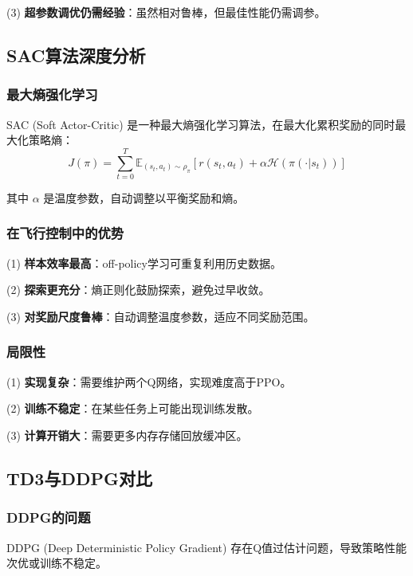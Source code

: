 (3) \textbf{超参数调优仍需经验}：虽然相对鲁棒，但最佳性能仍需调参。

\subsection{SAC算法深度分析}

\subsubsection{最大熵强化学习}

SAC (Soft Actor-Critic) 是一种最大熵强化学习算法，在最大化累积奖励的同时最大化策略熵：
\begin{equation}
J(\pi) = \sum_{t=0}^{T} \mathbb{E}_{(s_t,a_t)\sim\rho_\pi}\left[r(s_t,a_t) + \alpha \mathcal{H}(\pi(\cdot|s_t))\right]
\end{equation}

其中 $\alpha$ 是温度参数，自动调整以平衡奖励和熵。

\subsubsection{在飞行控制中的优势}

(1) \textbf{样本效率最高}：off-policy学习可重复利用历史数据。

(2) \textbf{探索更充分}：熵正则化鼓励探索，避免过早收敛。

(3) \textbf{对奖励尺度鲁棒}：自动调整温度参数，适应不同奖励范围。

\subsubsection{局限性}

(1) \textbf{实现复杂}：需要维护两个Q网络，实现难度高于PPO。

(2) \textbf{训练不稳定}：在某些任务上可能出现训练发散。

(3) \textbf{计算开销大}：需要更多内存存储回放缓冲区。

\subsection{TD3与DDPG对比}

\subsubsection{DDPG的问题}

DDPG (Deep Deterministic Policy Gradient) 存在Q值过估计问题，导致策略性能次优或训练不稳定。

